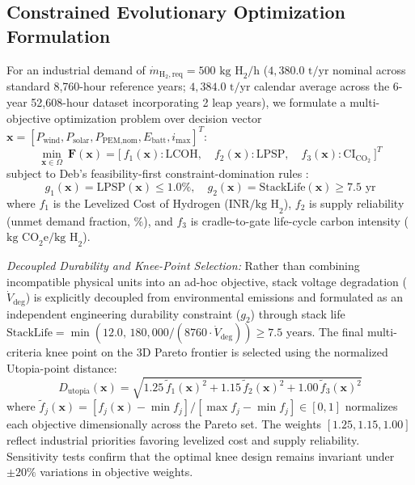 \documentclass[conference]{IEEEtran}
\begin{document}
\subsection{Constrained Evolutionary Optimization Formulation}
For an industrial demand of $\dot{m}_{\text{H}_2,\text{req}} = 500\text{ kg H}_2/\text{h}$ ($4,380.0\text{ t/yr}$ nominal across standard 8,760-hour reference years; $4,384.0\text{ t/yr}$ calendar average across the 6-year 52,608-hour dataset incorporating 2 leap years), we formulate a multi-objective optimization problem over decision vector $\mathbf{x} = [P_{\text{wind}}, P_{\text{solar}}, P_{\text{PEM,nom}}, E_{\text{batt}}, i_{\max}]^T$:
\begin{equation}
\min_{\mathbf{x} \in \Omega} \ \mathbf{F}(\mathbf{x}) = \Big[\ f_1(\mathbf{x}): \text{LCOH},\quad f_2(\mathbf{x}): \text{LPSP},\quad f_3(\mathbf{x}): \text{CI}_{\text{CO}_2}\ \Big]^T
\label{eq:nsga2_obj}
\end{equation}
subject to Deb's feasibility-first constraint-domination rules \cite{deb2002}:
\begin{equation}
g_1(\mathbf{x}) = \text{LPSP}(\mathbf{x}) \le 1.0\%, \quad g_2(\mathbf{x}) = \text{StackLife}(\mathbf{x}) \ge 7.5\text{ yr}
\label{eq:nsga2_con}
\end{equation}
where $f_1$ is the Levelized Cost of Hydrogen ($\text{INR/kg H}_2$), $f_2$ is supply reliability (unmet demand fraction, $\%$), and $f_3$ is cradle-to-gate life-cycle carbon intensity ($\text{kg CO}_2\text{e/kg H}_2$). 

\textit{Decoupled Durability and Knee-Point Selection:} Rather than combining incompatible physical units into an ad-hoc objective, stack voltage degradation ($\dot{V}_{\text{deg}}$) is explicitly decoupled from environmental emissions and formulated as an independent engineering durability constraint ($g_2$) through stack life $\text{StackLife} = \min(12.0,\, 180,000/(8760\cdot \dot{V}_{\text{deg}})) \ge 7.5\text{ years}$. The final multi-criteria knee point on the 3D Pareto frontier is selected using the normalized Utopia-point distance:
\begin{equation}
D_{\text{utopia}}(\mathbf{x}) = \sqrt{1.25\,\tilde{f}_1(\mathbf{x})^2 + 1.15\,\tilde{f}_2(\mathbf{x})^2 + 1.00\,\tilde{f}_3(\mathbf{x})^2}
\end{equation}
where $\tilde{f}_j(\mathbf{x}) = [f_j(\mathbf{x}) - \min f_j]/[\max f_j - \min f_j] \in [0, 1]$ normalizes each objective dimensionally across the Pareto set. The weights $[1.25, 1.15, 1.00]$ reflect industrial priorities favoring levelized cost and supply reliability. Sensitivity tests confirm that the optimal knee design remains invariant under $\pm 20\%$ variations in objective weights.
\end{document}
